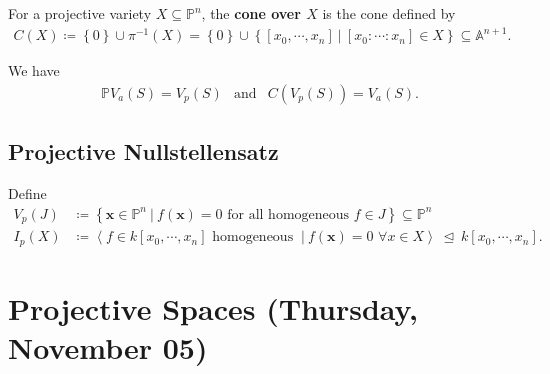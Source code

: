 \begin{definition}

For a projective variety \(X \subseteq {\mathbb{P}}^n\), the
\textbf{cone over \(X\)} is the cone defined by
\begin{align*}  
C(X) \coloneqq\left\{{0}\right\} \cup\pi^{-1}(X) = \left\{{0}\right\} \cup\left\{{ {\left[ {x_0, \cdots, x_n} \right]} {~\mathrel{\Big|}~}{\left[ {x_0: \cdots : x_n} \right]} \in X }\right\} \subseteq {\mathbb{A}}^{n+1}
.\end{align*}

\end{definition}

\begin{remark}

We have
\begin{align*}  
{\mathbb{P}}V_a(S) = V_p(S) &\text{and}& C(V_p(S)) = V_a(S)
.\end{align*}

\end{remark}

\hypertarget{projective-nullstellensatz}{%
\subsection{Projective
Nullstellensatz}\label{projective-nullstellensatz}}

\begin{proposition}

Define
\begin{align*}  
V_p(J) &\coloneqq\left\{{\mathbf{x} \in {\mathbb{P}}^n {~\mathrel{\Big|}~}f(\mathbf{x}) = 0 \text{ for all homogeneous } f\in J}\right\} \subseteq {\mathbb{P}}^n \\
I_p(X) &\coloneqq\left\langle{ f \in k[x_0, \cdots, x_n] \text{ homogeneous } {~\mathrel{\Big|}~}f(\mathbf{x}) = 0\,\, \forall x\in X}\right\rangle {~\trianglelefteq~}k[x_0, \cdots, x_n]
.\end{align*}

\end{proposition}


\hypertarget{projective-spaces-thursday-november-05}{%
\section{Projective Spaces (Thursday, November
05)}\label{projective-spaces-thursday-november-05}}

